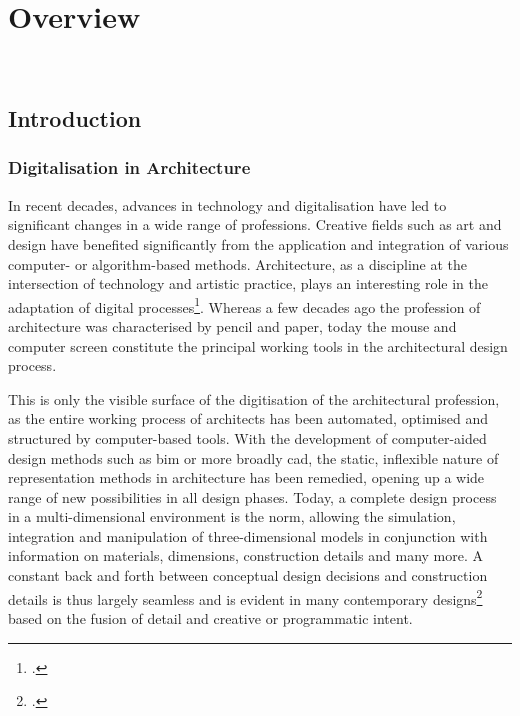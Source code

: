 \documentclass[a4paper, 12pt]{report}
\begin{document}
\part{Overview}\label{part:overview}

\newpage \ \thispagestyle{empty}
\newpage\clearpage

\chapter{Introduction}\label{chap:introduction}

\section{Digitalisation in Architecture}\label{sec:digitalisation-in-architecture}

In recent decades, advances in technology and digitalisation have led to significant changes in a wide range of professions. Creative fields such as art and design have benefited significantly from the application and integration of various computer- or algorithm-based methods. Architecture, as a discipline at the intersection of technology and artistic practice, plays an interesting role in the adaptation of digital processes\footcite{chaillou2022artificial}. Whereas a few decades ago the profession of architecture was characterised by pencil and paper, today the mouse and computer screen constitute the principal working tools in the architectural design process.

This is only the visible surface of the digitisation of the architectural profession, as the entire working process of architects has been automated, optimised and structured by computer-based tools. With the development of computer-aided design methods such as \acrshort{bim} or more broadly \acrshort{cad}, the static, inflexible nature of representation methods in architecture has been remedied, opening up a wide range of new possibilities in all design phases. Today, a complete design process in a multi-dimensional environment is the norm, allowing the simulation, integration and manipulation of three-dimensional models in conjunction with information on materials, dimensions, construction details and many more. A constant back and forth between conceptual design decisions and construction details is thus largely seamless and is evident in many contemporary designs\footcite{pena2021artificial} based on the fusion of detail and creative or programmatic intent.
\end{document}
